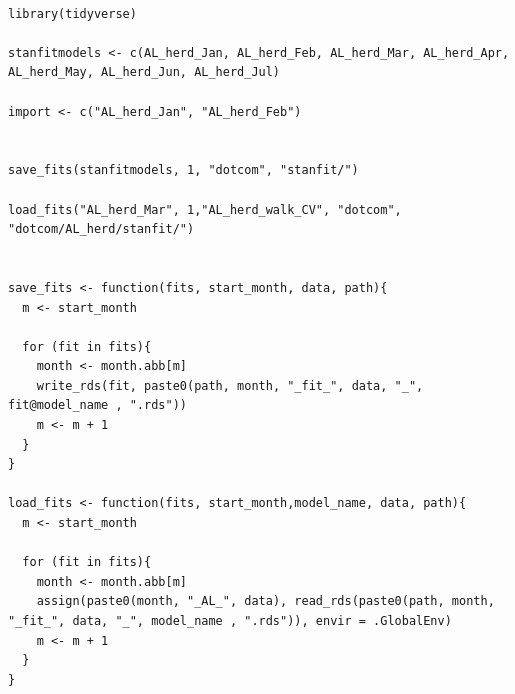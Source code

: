 \documentclass[ngerman]{ttlab-qualify}
\begin{document}
\begin{lstlisting}[style=custom, caption={\textit{R}-Script zum Speichern und Importieren der Stanfit-Objekte aus bzw. in den aktuellen Workspace}, label={r:save-load}]

library(tidyverse)

stanfitmodels <- c(AL_herd_Jan, AL_herd_Feb, AL_herd_Mar, AL_herd_Apr, AL_herd_May, AL_herd_Jun, AL_herd_Jul)

import <- c("AL_herd_Jan", "AL_herd_Feb")
  
  
save_fits(stanfitmodels, 1, "dotcom", "stanfit/")

load_fits("AL_herd_Mar", 1,"AL_herd_walk_CV", "dotcom", "dotcom/AL_herd/stanfit/")


save_fits <- function(fits, start_month, data, path){
  m <- start_month
  
  for (fit in fits){
    month <- month.abb[m]
    write_rds(fit, paste0(path, month, "_fit_", data, "_", fit@model_name , ".rds"))
    m <- m + 1
  }
}

load_fits <- function(fits, start_month,model_name, data, path){
  m <- start_month
  
  for (fit in fits){
    month <- month.abb[m]
    assign(paste0(month, "_AL_", data), read_rds(paste0(path, month, "_fit_", data, "_", model_name , ".rds")), envir = .GlobalEnv)
    m <- m + 1
  }
}

\end{lstlisting}
\end{document}
